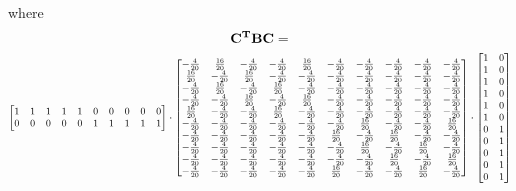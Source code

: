 \documentclass[a4paper,12pt]{article}
\begin{document}
	where 
	\[ {\bf C^T B C} = \] 
	\[\small \begin{bmatrix}
		1 & 1 & 1 & 1 & 1 & 0 & 0 & 0 & 0 & 0 \\
		0 & 0 & 0 & 0 & 0 & 1 & 1 & 1 & 1 & 1 \\
	\end{bmatrix}\cdot  \begin{bmatrix}
		-\frac{4}{20}& \frac{16}{20}& -\frac{4}{20}& -\frac{4}{20}& \frac{16}{20}& -\frac{4}{20}& -\frac{4}{20}& -\frac{4}{20}& -\frac{4}{20}& -\frac{4}{20}\\
		\frac{16}{20}& -\frac{4}{20}& \frac{16}{20}& -\frac{4}{20}& -\frac{4}{20}& -\frac{4}{20}& -\frac{4}{20}& -\frac{4}{20}& -\frac{4}{20}& -\frac{4}{20}\\
		-\frac{4}{20}& \frac{16}{20}& -\frac{4}{20}& \frac{16}{20}& -\frac{4}{20}& -\frac{4}{20}& -\frac{4}{20}& -\frac{4}{20}& -\frac{4}{20}& -\frac{4}{20}\\
		-\frac{4}{20}& -\frac{4}{20}& \frac{16}{20}& -\frac{4}{20}& \frac{16}{20}& -\frac{4}{20}& -\frac{4}{20}& -\frac{4}{20}& -\frac{4}{20}& -\frac{4}{20}\\
		\frac{16}{20}& -\frac{4}{20}& -\frac{4}{20}& \frac{16}{20}& -\frac{4}{20}& -\frac{4}{20}& -\frac{4}{20}& -\frac{4}{20}& -\frac{4}{20}& -\frac{4}{20}\\
		-\frac{4}{20}& -\frac{4}{20}& -\frac{4}{20}& -\frac{4}{20}& -\frac{4}{20}& -\frac{4}{20}& \frac{16}{20}& -\frac{4}{20}& -\frac{4}{20}& \frac{16}{20}\\
		-\frac{4}{20}& -\frac{4}{20}& -\frac{4}{20}& -\frac{4}{20}& -\frac{4}{20}& \frac{16}{20}& -\frac{4}{20}& \frac{16}{20}& -\frac{4}{20}& -\frac{4}{20}\\
		-\frac{4}{20}& -\frac{4}{20}& -\frac{4}{20}& -\frac{4}{20}& -\frac{4}{20}& -\frac{4}{20}& \frac{16}{20}& -\frac{4}{20}& \frac{16}{20}& -\frac{4}{20}\\
		-\frac{4}{20}& -\frac{4}{20}& -\frac{4}{20}& -\frac{4}{20}& -\frac{4}{20}& -\frac{4}{20}& -\frac{4}{20}& \frac{16}{20}& -\frac{4}{20}& \frac{16}{20}\\
		-\frac{4}{20}& -\frac{4}{20}& -\frac{4}{20}& -\frac{4}{20}& -\frac{4}{20}& \frac{16}{20}& -\frac{4}{20}& -\frac{4}{20}& \frac{16}{20}& -\frac{4}{20}
	\end{bmatrix} \cdot 
	\begin{bmatrix}
	1 & 0 \\ 
	1 & 0 \\
	1 & 0 \\
	1 & 0 \\ 
	1 & 0 \\ 
	1 & 0 \\ 
	0 & 1 \\ 
	0 & 1 \\ 
	0 & 1 \\ 
	0 & 1 \\ 
	0 & 1 
	\end{bmatrix}\]
	
\end{document}
